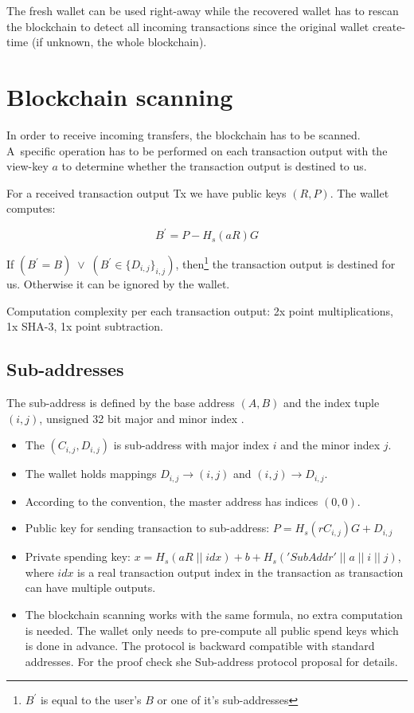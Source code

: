 \documentclass[]{article}
\begin{document}
The fresh wallet can be used right-away while the recovered wallet has to rescan the blockchain to detect all incoming transactions since the original wallet create-time (if unknown, the whole blockchain).

\section{Blockchain scanning}

In order to receive incoming transfers, the blockchain has to be scanned. A~specific operation has to be performed on each transaction output with the view-key $a$ to determine whether the transaction output is destined to us.

For a received transaction output Tx we have public keys $\left(R, P\right)$.
The wallet computes: 

\begin{equation}
B^\prime = P - H_s(aR)G
\end{equation}


If $\left(B^\prime = B\right) \; \vee \; \left(B^\prime \in \{D_{i,j}\}_{i,j}\right)$, then\footnote{$B^\prime$ is equal to the user's $B$ or one of it's sub-addresses} the transaction output is destined for us. Otherwise it can be ignored by the wallet.

Computation complexity per each transaction output: 2x point multiplications, 1x SHA-3, 1x point subtraction.

\subsection{Sub-addresses}
The sub-address is defined by the base address $(A,B)$ and the index tuple $(i,j)$, unsigned 32 bit major and minor index \cite{mrl_006_subaddr}.

\begin{itemize}
	\item The $(C_{i,j}, D_{i,j})$ is sub-address with major index $i$ and the minor index $j$.
	
	\item  The wallet holds mappings $D_{i,j} \rightarrow (i, j)$ and $(i, j) \rightarrow D_{i,j}$. 
	
	\item According to the convention, the master address has indices $(0, 0)$.
	
	\item Public key for sending transaction to sub-address: $P = H_s(rC_{i,j})G + D_{i,j}$
	
	\item Private spending key: $x = H_s(aR \; || \; idx) + b + H_s('SubAddr' \; || \; a \; || \; i \; || \; j)$, where $idx$ is a real transaction output index in the transaction as transaction can have multiple outputs.
	
	\item The blockchain scanning works with the same formula, no extra computation is needed. The wallet only needs to pre-compute all public spend keys which is done in advance. The protocol is backward compatible with standard addresses. For the proof check she Sub-address protocol proposal \cite{mrl_006_subaddr} for details.
\end{itemize}
\end{document}
